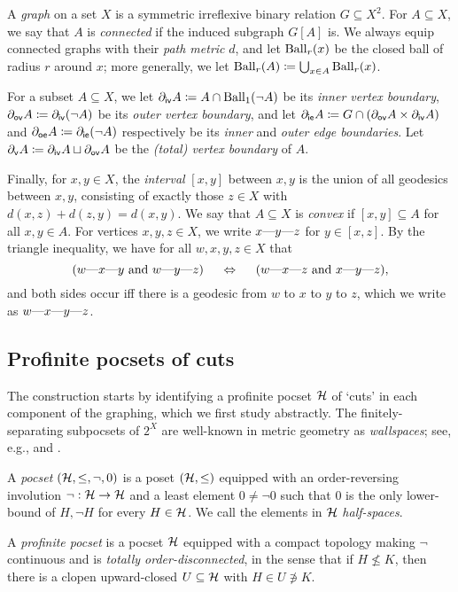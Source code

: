 \documentclass[reqno]{amsart}
\begin{document}
    \begin{notation*}
        A \textit{graph} on a set $X$ is a symmetric irreflexive binary relation $G\subseteq X^2$. For $A\subseteq X$, we say that $A$ is \textit{connected} if the induced subgraph $G[A]$ is. We always equip connected graphs with their \textit{path metric} $d$, and let $\Ball_r(x)$ be the closed ball of radius $r$ around $x$; more generally, we let $\Ball_r(A)\coloneqq\bigcup_{x\in A}\Ball_r(x)$.

        For a subset $A\subseteq X$, we let $\del_\mathsf{iv}A\coloneqq A\cap\Ball_1(\lnot A)$ be its \textit{inner vertex boundary}, $\del_\mathsf{ov}A\coloneqq\del_\mathsf{iv}(\lnot A)$ be its \textit{outer vertex boundary}, and let $\del_\mathsf{ie}A\coloneqq G\cap(\del_\mathsf{ov}A\times\del_\mathsf{iv}A)$ and $\del_\mathsf{oe}A\coloneqq\del_\mathsf{ie}(\lnot A)$ respectively be its \textit{inner} and \textit{outer edge boundaries}. Let $\del_\mathsf{v}A\coloneqq\del_\mathsf{iv}A\sqcup\del_\mathsf{ov}A$ be the \textit{(total) vertex boundary} of $A$.

        Finally, for $x,y\in X$, the \textit{interval} $[x,y]$ between $x,y$ is the union of all geodesics between $x,y$, consisting of exactly those $z\in X$ with $d(x,z)+d(z,y)=d(x,y)$. We say that $A\subseteq X$ is \textit{convex} if $[x,y]\subseteq A$ for all $x,y\in A$. For vertices $x,y,z\in X$, we write $x\-y\-z$ for $y\in[x,z]$. By the triangle inequality, we have for all $w,x,y,z\in X$ that
        \begin{equation*}
            (w\-x\-y\textrm{ and }w\-y\-z)\ \ \ \ \Leftrightarrow\ \ \ \ (w\-x\-z\textrm{ and }x\-y\-z),
        \end{equation*}
        and both sides occur iff there is a geodesic from $w$ to $x$ to $y$ to $z$, which we write as $w\-x\-y\-z$.
    \end{notation*}

    \subsection{Profinite pocsets of cuts}\label{sec:pocsets_of_cuts}

    The construction starts by identifying a profinite pocset $\mc{H}$ of `cuts' in each component of the graphing, which we first study abstractly. The finitely-separating subpocsets of $2^X$ are well-known in metric geometry as \textit{wallspaces}; see, e.g., \cite{Nic04} and \cite{CN05}.

    \begin{definition}\label{def:profinite_pocset}
        A \textit{pocset} $(\mc{H},\leq,\lnot,0)$ is a poset $(\mc{H},\leq)$ equipped with an order-reversing involution $\lnot:\mc{H}\to\mc{H}$ and a least element $0\neq\lnot0$ such that $0$ is the only lower-bound of $H,\lnot H$ for every $H\in\mc{H}$. We call the elements in $\mc{H}$ \textit{half-spaces}.

        A \textit{profinite pocset} is a pocset $\mc{H}$ equipped with a compact topology making $\lnot$ continuous and is \textit{totally order-disconnected}, in the sense that if $H\not\leq K$, then there is a clopen upward-closed $U\subseteq\mc{H}$ with $H\in U\not\ni K$.
    \end{definition}
\end{document}
